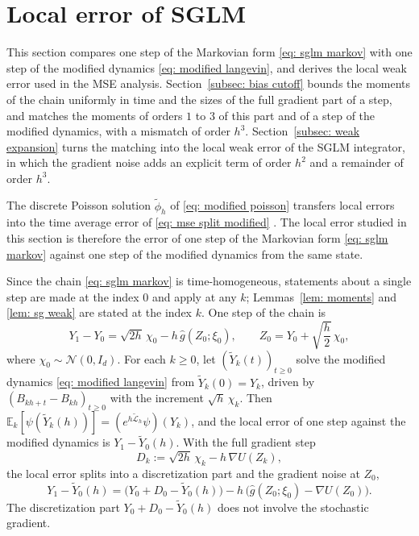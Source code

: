 \documentclass{article}
\newcommand{\Ge}{\geqslant}
\numberwithin{equation}{section}
\begin{document}
\section{Local error of SGLM}
\label{sec: local}

This section compares one step of the Markovian form \eqref{eq: sglm markov} with one step of the modified dynamics \eqref{eq: modified langevin}, and derives the local weak error used in the MSE analysis. Section~\ref{subsec: bias cutoff} bounds the moments of the chain uniformly in time and the sizes of the full gradient part of a step, and matches the moments of orders $1$ to $3$ of this part and of a step of the modified dynamics, with a mismatch of order $h^3$. Section~\ref{subsec: weak expansion} turns the matching into the local weak error of the SGLM integrator, in which the gradient noise adds an explicit term of order $h^2$ and a remainder of order $h^3$.

The discrete Poisson solution $\tilde\phi_h$ of \eqref{eq: modified poisson} transfers local errors into the time average error of \eqref{eq: mse split modified} \citep{lu2025mse, ye2026mse}. The local error studied in this section is therefore the error of one step of the Markovian form \eqref{eq: sglm markov} against one step of the modified dynamics from the same state.

Since the chain \eqref{eq: sglm markov} is time-homogeneous, statements about a single step are made at the index $0$ and apply at any $k$; Lemmas~\ref{lem: moments} and \ref{lem: sg weak} are stated at the index $k$. One step of the chain is
\begin{equation}
    Y_1 - Y_0 = \sqrt{2h}\, \chi_0 - h\, \hat g(Z_0;\xi_0) , \qquad Z_0 = Y_0 + \sqrt{\frac h2}\, \chi_0 ,
    \label{eq: sg chain step}
\end{equation}
where $\chi_0 \sim \mathcal N(0, I_d)$. For each $k \Ge 0$, let $(\tilde Y_k(t))_{t \Ge 0}$ solve the modified dynamics \eqref{eq: modified langevin} from $\tilde Y_k(0) = Y_k$, driven by $(B_{kh+t} - B_{kh})_{t \Ge 0}$ with the increment $\sqrt h\, \chi_k$. Then $\mathbb E_k[\psi(\tilde Y_k(h))] = (e^{h\tilde{\mathcal L}_h} \psi)(Y_k)$, and the local error of one step against the modified dynamics is $Y_1 - \tilde Y_0(h)$. With the full gradient step
\begin{equation}
    D_k := \sqrt{2h}\, \chi_k - h\, \nabla U(Z_k) ,
    \label{eq: full gradient step}
\end{equation}
the local error splits into a discretization part and the gradient noise at $Z_0$,
\begin{equation}
    Y_1 - \tilde Y_0(h) = \bigl( Y_0 + D_0 - \tilde Y_0(h) \bigr) - h\, \bigl( \hat g(Z_0;\xi_0) - \nabla U(Z_0) \bigr) .
    \label{eq: local error split}
\end{equation}
The discretization part $Y_0 + D_0 - \tilde Y_0(h)$ does not involve the stochastic gradient.
\end{document}
